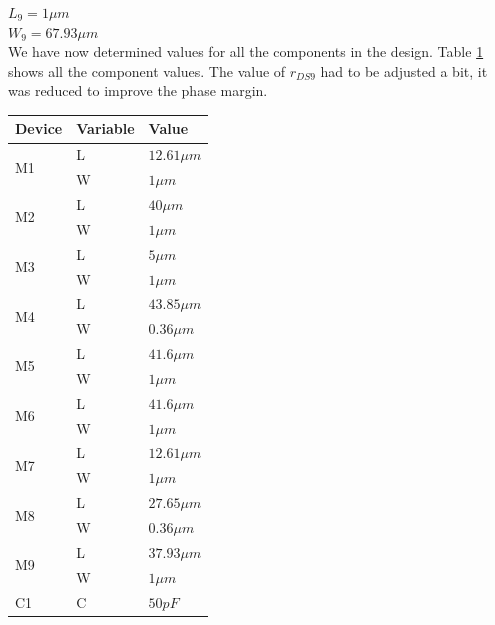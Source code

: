 $L_{9} = 1\mu m$ \\
$W_{9} = 67.93\mu m$ \\

We have now determined values for all the components in the design.
Table \ref{tab:vals} shows all the component values.
The value of $r_{DS9}$ had to be adjusted a bit, it was reduced to improve the phase margin.

\begin{table}[h]
	\begin{tabular}{| l | l | l |}
		\hline
		Device			& Variable	& Value		\\
		\hline
		\multirow{2}{*}{M1}	& L		& $12.61\mu m$	\\
					& W		& $1\mu m$	\\
		\hline
		\multirow{2}{*}{M2}	& L		& $40\mu m$	\\
					& W		& $1\mu m$	\\
		\hline
		\multirow{2}{*}{M3}	& L		& $5\mu m$	\\
					& W		& $1\mu m$	\\
		\hline
		\multirow{2}{*}{M4}	& L		& $43.85\mu m$	\\
					& W		& $0.36\mu m$	\\
		\hline
		\multirow{2}{*}{M5}	& L		& $41.6\mu m$	\\
					& W		& $1\mu m$	\\
		\hline
		\multirow{2}{*}{M6}	& L		& $41.6\mu m$	\\
					& W		& $1\mu m$	\\
		\hline
		\multirow{2}{*}{M7}	& L		& $12.61\mu m$	\\
					& W		& $1\mu m$	\\
		\hline
		\multirow{2}{*}{M8}	& L		& $27.65\mu m$	\\
					& W		& $0.36\mu m$	\\
		\hline
		\multirow{2}{*}{M9}	& L		& $37.93\mu m$	\\
					& W		& $1\mu m$	\\
		\hline
		\multirow{1}{*}{C1}	& C		& $50pF$	\\
		\hline
	\end{tabular}
	\label{tab:vals}
\end{table}
